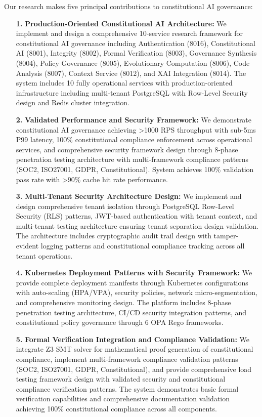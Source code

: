 \documentclass[manuscript,screen,9pt]{acmart}
\begin{document}
Our research makes five principal contributions to constitutional AI governance:
\begin{enumerate}[leftmargin=*,itemsep=2pt,parsep=1pt]
    \item[\textbf{1.}] \textbf{Production-Oriented Constitutional AI Architecture:} We implement and design a comprehensive 10-service research framework for constitutional AI governance including Authentication (8016), Constitutional AI (8001), Integrity (8002), Formal Verification (8003), Governance Synthesis (8004), Policy Governance (8005), Evolutionary Computation (8006), Code Analysis (8007), Context Service (8012), and XAI Integration (8014). The system includes 10 fully operational services with production-oriented infrastructure including multi-tenant PostgreSQL with Row-Level Security design and Redis cluster integration.

    \item[\textbf{2.}] \textbf{Validated Performance and Security Framework:} We demonstrate constitutional AI governance achieving >1000 RPS throughput with sub-5ms P99 latency, 100\% constitutional compliance enforcement across operational services, and comprehensive security framework design through 8-phase penetration testing architecture with multi-framework compliance patterns (SOC2, ISO27001, GDPR, Constitutional). System achieves 100\% validation pass rate with >90\% cache hit rate performance.

    \item[\textbf{3.}] \textbf{Multi-Tenant Security Architecture Design:} We implement and design comprehensive tenant isolation through PostgreSQL Row-Level Security (RLS) patterns, JWT-based authentication with tenant context, and multi-tenant testing architecture ensuring tenant separation design validation. The architecture includes cryptographic audit trail design with tamper-evident logging patterns and constitutional compliance tracking across all tenant operations.

    \item[\textbf{4.}] \textbf{Kubernetes Deployment Patterns with Security Framework:} We provide complete deployment manifests through Kubernetes configurations with auto-scaling (HPA/VPA), security policies, network micro-segmentation, and comprehensive monitoring design. The platform includes 8-phase penetration testing architecture, CI/CD security integration patterns, and constitutional policy governance through 6 OPA Rego frameworks.

    \item[\textbf{5.}] \textbf{Formal Verification Integration and Compliance Validation:} We integrate Z3 SMT solver for mathematical proof generation of constitutional compliance, implement multi-framework compliance validation patterns (SOC2, ISO27001, GDPR, Constitutional), and provide comprehensive load testing framework design with validated security and constitutional compliance verification patterns. The system demonstrates basic formal verification capabilities and comprehensive documentation validation achieving 100\% constitutional compliance across all components.
\end{enumerate}
\end{document}
